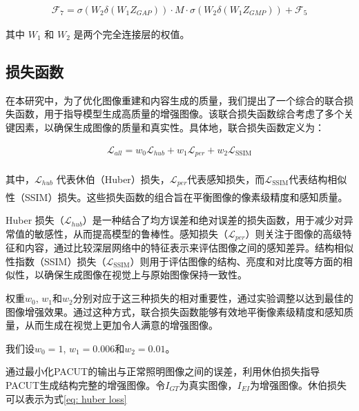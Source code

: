 \documentclass[a4paper]{ctexart}
\newcommand{\upcite}[1]{\rmfamily\textsuperscript{\textsuperscript{\cite{#1}}}}
\begin{document}
\begin{equation}
	\begin{aligned}
		\mathcal{F}_7 = \sigma \left( W_2 \delta (W_1 Z_{GAP}) \right) \cdot M \cdot \sigma \left( W_2 \delta (W_1 Z_{GMP})\right) +  \mathcal{F}_5
	\end{aligned}
	\label{eq: recalibrated feature map}
\end{equation}
	
其中 $W_1$ 和 $W_2$ 是两个完全连接层的权值。

\subsection{损失函数}

在本研究中，为了优化图像重建和内容生成的质量，我们提出了一个综合的联合损失函数，用于指导模型生成高质量的增强图像。该联合损失函数综合考虑了多个关键因素，以确保生成图像的质量和真实性。具体地，联合损失函数定义为：

\begin{equation}
	\begin{aligned}
		\mathcal{L}_{all} = w_0 \mathcal{L}_{hub} + w_1 \mathcal{L}_{per} + w_2 \mathcal{L}_{\text{SSIM}}
	\end{aligned}
	\label{eq: loss function}
\end{equation}

其中，$\mathcal{L}_{hub}$ 代表休伯（Huber）损失\upcite{huber1992robust}，$\mathcal{L}_{per}$代表感知损失\upcite{johnson2016perceptual}，而$\mathcal{L}_{\text{SSIM}}$代表结构相似性（SSIM）损失\upcite{wang2004image}。这些损失函数的组合旨在平衡图像的像素级精度和感知质量。

Huber 损失（$\mathcal{L}_{hub}$）是一种结合了均方误差和绝对误差的损失函数，用于减少对异常值的敏感性，从而提高模型的鲁棒性。感知损失（$\mathcal{L}_{per}$）则关注于图像的高级特征和内容，通过比较深层网络中的特征表示来评估图像之间的感知差异。结构相似性指数（SSIM）损失（$\mathcal{L}_{\text{SSIM}}$）则用于评估图像的结构、亮度和对比度等方面的相似性，以确保生成图像在视觉上与原始图像保持一致性。

权重$w_0$, $w_1$和$w_2$分别对应于这三种损失的相对重要性，通过实验调整以达到最佳的图像增强效果。通过这种方式，联合损失函数能够有效地平衡像素级精度和感知质量，从而生成在视觉上更加令人满意的增强图像。

我们设$w_0 = 1$, $w_1 = 0.006$和$w_2 = 0.01$。

通过最小化PACUT的输出与正常照明图像之间的误差，利用休伯损失指导PACUT生成结构完整的增强图像。令$I_{GT}$为真实图像，$I_{EI}$为增强图像。休伯损失可以表示为式\ref{eq: huber loss}
\end{document}
